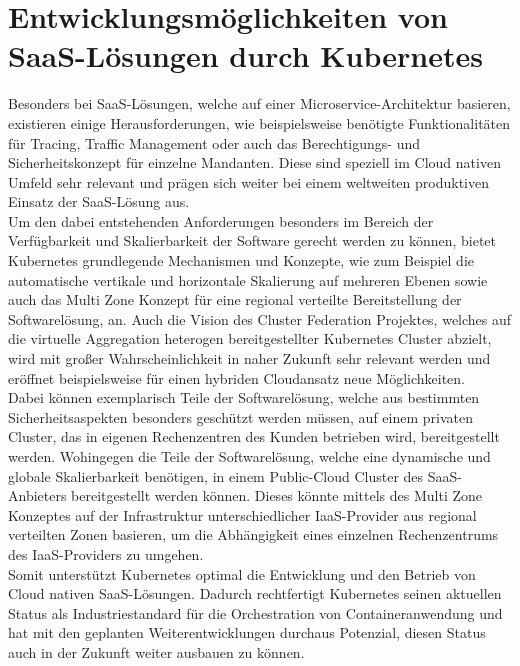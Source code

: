 \section{Entwicklungsmöglichkeiten von \acs{SaaS}-Lösungen durch Kubernetes}
\label{Entwicklungsmöglichkeiten_Kubernetes_SaaS}
Besonders bei \ac{SaaS}-Lösungen, welche auf einer Microservice-Architektur basieren, existieren einige Herausforderungen, wie beispielsweise benötigte Funktionalitäten für Tracing, Traffic Management oder auch das Berechtigungs- und Sicherheitskonzept für einzelne Mandanten. Diese sind speziell im Cloud nativen Umfeld sehr relevant und prägen sich weiter bei einem weltweiten produktiven Einsatz der \ac{SaaS}-Lösung aus.\\
Um den dabei entstehenden Anforderungen besonders im Bereich der Verfügbarkeit und Skalierbarkeit der Software gerecht werden zu können, bietet Kubernetes grundlegende Mechanismen und Konzepte, wie zum Beispiel die automatische vertikale und horizontale Skalierung auf mehreren Ebenen sowie auch das Multi Zone Konzept für eine regional verteilte Bereitstellung der Softwarelösung, an. Auch die Vision des Cluster Federation Projektes, welches auf die virtuelle Aggregation heterogen bereitgestellter Kubernetes Cluster abzielt, wird mit großer Wahrscheinlichkeit in naher Zukunft sehr relevant werden und eröffnet beispielsweise für einen hybriden Cloudansatz neue Möglichkeiten.\\ 
Dabei können exemplarisch Teile der Softwarelösung, welche aus bestimmten Sicherheitsaspekten besonders geschützt werden müssen, auf einem privaten Cluster, das in eigenen Rechenzentren des Kunden betrieben wird, bereitgestellt werden. Wohingegen die Teile der Softwarelösung, welche eine dynamische und globale Skalierbarkeit benötigen, in einem Public-Cloud Cluster des \ac{SaaS}-Anbieters bereitgestellt werden können. Dieses könnte mittels des Multi Zone Konzeptes auf der Infrastruktur unterschiedlicher \ac{IaaS}-Provider aus regional verteilten Zonen basieren, um die Abhängigkeit eines einzelnen Rechenzentrums des \ac{IaaS}-Providers zu umgehen.\\
Somit unterstützt Kubernetes optimal die Entwicklung und den Betrieb von Cloud nativen \ac{SaaS}-Lösungen. Dadurch rechtfertigt Kubernetes seinen aktuellen Status als Industriestandard für die Orchestration von Containeranwendung und hat mit den geplanten Weiterentwicklungen durchaus Potenzial, diesen Status auch in der Zukunft weiter ausbauen zu können. 
